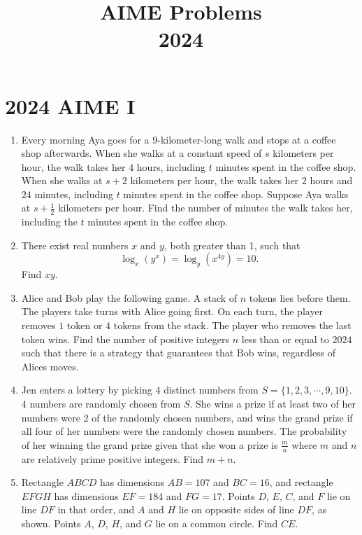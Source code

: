 \documentclass{article}
\title{AIME Problems \\ 2024}
\date{}
\begin{document}
\maketitle\thispagestyle{fancy}\newpage\section*{2024 AIME I}\begin{enumerate}[label=\arabic*., itemsep=0.5em]\item Every morning Aya goes for a \(9\)-kilometer-long walk and stops at a coffee shop afterwards. When she walks at a constant speed of \(s\) kilometers per hour, the walk takes her \(4\) hours, including \(t\) minutes spent in the coffee shop. When she walks at \(s + 2\) kilometers per hour, the walk takes her \(2\) hours and \(24\) minutes, including \(t\) minutes spent in the coffee shop. Suppose Aya walks at \(s + \frac{1}{2}\)
kilometers per hour. Find the number of minutes the walk takes her, including the \(t\) minutes spent in the coffee shop.\par \vspace{0.5em}\item There exist real numbers \(x\) and \(y\), both greater than 1, such that 
\begin{equation*}
\log_x(y^x) = \log_y(x^{4y}) = 10.
\end{equation*}
 Find \(xy\).\par \vspace{0.5em}\item Alice and Bob play the following game. A stack of \(n\) tokens lies before them. The players take turns with Alice going first. On each turn, the player removes \(1\) token or \(4\) tokens from the stack. The player who removes the last token wins. Find the number of positive integers \(n\) less than or equal to \(2024\) such that there is a strategy that guarantees that Bob wins, regardless of Alices moves.\par \vspace{0.5em}\item Jen enters a lottery by picking \(4\) distinct numbers from \(S=\{1,2,3,\cdots,9,10\}.\) \(4\) numbers are randomly chosen from \(S.\) She wins a prize if at least two of her numbers were \(2\) of the randomly chosen numbers, and wins the grand prize if all four of her numbers were the randomly chosen numbers. The probability of her winning the grand prize given that she won a prize is \(\tfrac{m}{n}\) where \(m\) and \(n\) are relatively prime positive integers. Find \(m+n\).\par \vspace{0.5em}\item Rectangle \(ABCD\) has dimensions \(AB = 107\) and \(BC = 16\), and rectangle \(EFGH\) has dimensions \(EF = 184\) and \(FG = 17\). Points \(D\), \(E\), \(C\), and \(F\) lie on line \(DF\) in that order, and \(A\) and \(H\) lie on opposite sides of line \(DF\), as shown. Points \(A\), \(D\), \(H\), and \(G\) lie on a common circle. Find \(CE\).



\end{enumerate}
\end{document}
